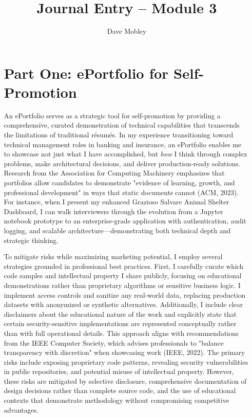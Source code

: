 \documentclass[12pt,stu]{apa7}
\title{Journal Entry – Module 3}
\author{Dave Mobley}
\affiliation{Southern New Hampshire University}
\begin{document}
\maketitle

\section*{Part One: ePortfolio for Self-Promotion}

An ePortfolio serves as a strategic tool for self-promotion by providing a comprehensive, curated demonstration of technical capabilities that transcends the limitations of traditional résumés. In my experience transitioning toward technical management roles in banking and insurance, an ePortfolio enables me to showcase not just what I have accomplished, but \textit{how} I think through complex problems, make architectural decisions, and deliver production-ready solutions. Research from the Association for Computing Machinery emphasizes that portfolios allow candidates to demonstrate "evidence of learning, growth, and professional development" in ways that static documents cannot (ACM, 2023). For instance, when I present my enhanced Grazioso Salvare Animal Shelter Dashboard, I can walk interviewers through the evolution from a Jupyter notebook prototype to an enterprise-grade application with authentication, audit logging, and scalable architecture—demonstrating both technical depth and strategic thinking.

To mitigate risks while maximizing marketing potential, I employ several strategies grounded in professional best practices. First, I carefully curate which code samples and intellectual property I share publicly, focusing on educational demonstrations rather than proprietary algorithms or sensitive business logic. I implement access controls and sanitize any real-world data, replacing production datasets with anonymized or synthetic alternatives. Additionally, I include clear disclaimers about the educational nature of the work and explicitly state that certain security-sensitive implementations are represented conceptually rather than with full operational details. This approach aligns with recommendations from the IEEE Computer Society, which advises professionals to "balance transparency with discretion" when showcasing work (IEEE, 2022). The primary risks include exposing proprietary code patterns, revealing security vulnerabilities in public repositories, and potential misuse of intellectual property. However, these risks are mitigated by selective disclosure, comprehensive documentation of design decisions rather than complete source code, and the use of educational contexts that demonstrate methodology without compromising competitive advantages.
\end{document}
